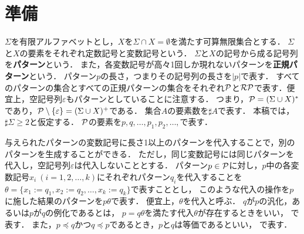 \section{準備}
$\Sigma$を有限アルファベットとし，$X$を$\Sigma \cap X=\emptyset$を満たす可算無限集合とする．
$\Sigma$と$X$の要素をそれぞれ定数記号と変数記号という．
$\Sigma$と$X$の記号から成る記号列を\textbf{パターン}という．
また，各変数記号が高々1回しか現れないパターンを\textbf{正規パターン}という．
パターン$p$の長さ，つまりその記号列の長さを$|p|$で表す．
すべてのパターンの集合とすべての正規パターンの集合をそれぞれ$\mathcal P$と$\mathcal{RP}$で表す．便宜上，空記号列$\varepsilon$もパターンとしていることに注意する．
つまり，$\mathcal P=(\Sigma \cup X)^{*}$であり，$\mathcal P\setminus\{\varepsilon\}=(\Sigma \cup X)^{+}$である．
集合$A$の要素数を$\sharp A$で表す．
本稿では，$\sharp \Sigma \geq 2$と仮定する．
$\mathcal P$の要素を$p,q,\ldots,p_1,p_2,\ldots,$で表す．



与えられたパターンの変数記号に長さ1以上のパターンを代入することで，別のパターンを生成することができる．
ただし，同じ変数記号には同じパターンを代入し，空記号列$\varepsilon$は代入しないこととする．
パターン$p \in \mathcal P$に対し，$p$中の各変数記号$x_i~(i=1,2,\ldots,k)$にそれぞれパターン$q_i$を代入することを$\theta=\{x_1:=q_1,x_2:=q_2,\ldots,x_k:=q_k\}$で表すこととし，
このような代入の操作を$p$に施した結果のパターンを$p\theta$で表す．
便宜上，$\theta$を代入と呼ぶ．
$q$が$p$の汎化，あるいは$p$が$q$の例化であるとは，
$p=q \theta$を満たす代入$\theta$が存在するときをいい，
で表す．
また，$p \preceq q$かつ$q \preceq p$であるとき，$p$と$q$は等価であるといい， で表す．

